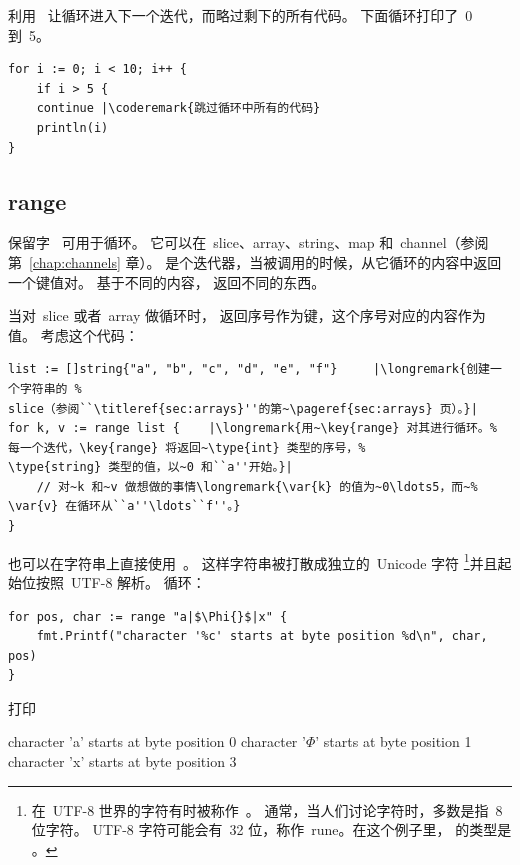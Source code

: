 利用~ 让循环进入下一个迭代，而略过剩下的所有代码。
下面循环打印了~0 到~5。
\begin{lstlisting}
for i := 0; i < 10; i++ {
    if i > 5 {
	continue |\coderemark{跳过循环中所有的代码}
    println(i)
}
\end{lstlisting}

\subsection{range}
保留字~ 可用于循环。
它可以在~slice、array、string、map 和~channel（参阅第~\ref{chap:channels} 章）。
 是个迭代器，当被调用的时候，从它循环的内容中返回一个键值对。
基于不同的内容， 返回不同的东西。

当对~slice 或者~array 做循环时， 返回序号作为键，这个序号对应的内容作为值。
考虑这个代码：
\begin{lstlisting}
list := []string{"a", "b", "c", "d", "e", "f"}     |\longremark{创建一个字符串的 %
slice（参阅``\titleref{sec:arrays}''的第~\pageref{sec:arrays} 页）。}|
for k, v := range list {	|\longremark{用~\key{range} 对其进行循环。%
每一个迭代，\key{range} 将返回~\type{int} 类型的序号，%
\type{string} 类型的值，以~0 和``a''开始。}|
    // 对~k 和~v 做想做的事情\longremark{\var{k} 的值为~0\ldots5，而~%
\var{v} 在循环从``a''\ldots``f''。}
}
\end{lstlisting}
\showremarks

也可以在字符串上直接使用~。
这样字符串被打散成独立的~Unicode 字符
\footnote{在~UTF-8 世界的字符有时被称作~。
通常，当人们讨论字符时，多数是指~8 位字符。
UTF-8 字符可能会有~32 位，称作~rune。在这个例子里， 的类型是 。}并且起始位按照~UTF-8 解析。
循环：
\begin{lstlisting}
for pos, char := range "a|$\Phi{}$|x" {
    fmt.Printf("character '%c' starts at byte position %d\n", char, pos)
}
\end{lstlisting}
打印
\begin{display}
character 'a' starts at byte position 0
character '\begin{math}\Phi\end{math}' starts at byte position 1
character 'x' starts at byte position 3 
\end{display}

